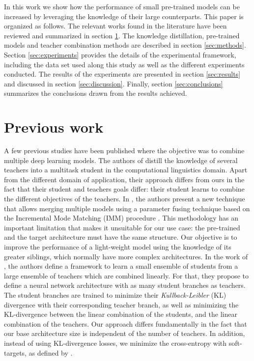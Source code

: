 \documentclass{elsarticle}
\begin{document}
	In this work we show how the performance of small pre-trained models can be increased by leveraging the knowledge of their large counterparts. This paper is organized as follows. The relevant works found in the literature have been reviewed and summarized in section \ref{sec:prevwork}. The knowledge distillation, pre-trained models and teacher combination methods are described in section  \ref{sec:methods}. Section \ref{sec:experiments} provides the details of the experimental framework, including the data set used along this study as well as the different experiments conducted. The results of the experiments are presented in section \ref{sec:results} and discussed in section \ref{sec:discussion}. Finally, section \ref{sec:conclusions} summarizes the conclusions drawn from the results achieved.

	\section{Previous work} \label{sec:prevwork}	
	A few previous studies have been published where the objective was to combine multiple deep learning models. The authors of \citep{liu2020} distill the knowledge of several teachers into a multitask student in the computational linguistics domain. Apart from the different domain of application, their approach differs from ours in the fact that their student and teachers goals differ: their student learns to combine the different objectives of the teachers. In \citep{geyer2019}, the authors present a new technique that allows merging multiple models using a parameter fusing technique based on the Incremental Mode Matching (IMM) procedure \citep{lee2017}. This methodology has an important limitation that makes it unsuitable for our use case: the pre-trained and the target architecture must have the same structure. Our objective is to improve the performance of a light-weight model using the knowledge of its greater siblings, which normally have more complex architectures. In the work of \citep{asif2019}, the authors define a framework to learn a small ensemble of students from a large ensemble of teachers which are combined linearly. For that, they propose to define a neural network architecture with as many student branches as teachers. The student branches are trained to minimize their \textit{Kullback-Leibler} (KL) divergence with their corresponding teacher branch, as well as minimizing the KL-divergence between the linear combination of the students, and the linear combination of the teachers. Our approach differs fundamentally in the fact that our base architecture size is independent of the number of teachers. In addition, instead of using KL-divergence losses, we minimize the cross-entropy with soft-targets, as defined by \citep{hinton2015}.
\end{document}
